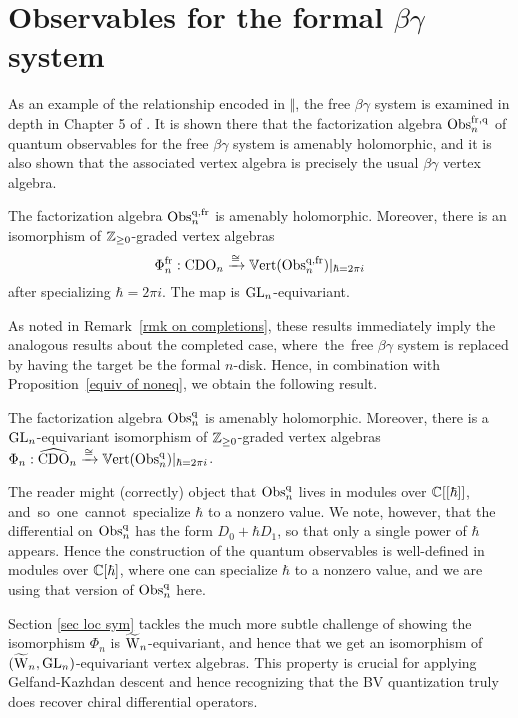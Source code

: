 \section{Observables for the formal $\beta\gamma$ system}

As an example of the relationship encoded in $\Vert$,
the free $\beta\gamma$ system is examined in depth in Chapter 5 of \cite{CG1}.
It is shown there that the factorization algebra ${\rm Obs}^{{\rm fr},{\rm q}}_n$ of quantum observables for the free $\beta\gamma$ system is amenably holomorphic,
and it is also shown that the associated vertex algebra is precisely the usual $\beta\gamma$ vertex algebra.

\begin{thm}
The factorization algebra ${\rm Obs}^{{\rm q},{\rm fr}}_n$ is amenably holomorphic. 
Moreover, 
there is an isomorphism of $\mathbb Z_{\geq 0}$-graded vertex algebras 
\[
\Phi^{{\rm fr}}_n : {\rm CDO}_n \xrightarrow{\cong} \mathbb{V}{\rm ert}({\rm Obs}^{{\rm q},{\rm fr}}_n)|_{\hbar= 2 \pi i}
\] 
after specializing $\hbar=2 \pi i$.
The map is ${\rm GL}_n$-equivariant.
\end{thm}

As noted in Remark~\ref{rmk on completions}, 
these results immediately imply the analogous results about the completed case, \si 
where the free $\beta\gamma$ system is replaced by having the target be the formal $n$-disk.
Hence, in combination with Proposition~\ref{equiv of noneq},
we obtain the following result.

\begin{cor}
The factorization algebra ${\rm Obs}^{\rm q}_n$ is amenably holomorphic. 
Moreover, there is a ${\rm GL}_n$-equivariant isomorphism of $\mathbb Z_{\geq 0}$-graded vertex algebras 
$\Phi_n : \widehat{\rm CDO}_n \xrightarrow{\cong} \mathbb{V}{\rm ert}({\rm Obs}^{\rm q}_n)|_{\hbar= 2 \pi i}$.
\end{cor}

\begin{rmk}
The reader might (correctly) object that ${\rm Obs}^{\rm q}_n$ lives in modules over $\mathbb C[[\hbar]]$, \si 
and so one cannot specialize $\hbar$ to a nonzero value.
We note, however, that the differential on ${\rm Obs}^{\rm q}_n$ has the form $D_0 + \hbar D_1$, 
so that only a single power of $\hbar$ appears.
Hence the construction of the quantum observables is well-defined in modules over $\mathbb C[\hbar]$,
where one can specialize $\hbar$ to a nonzero value,
and we are using that version of ${\rm Obs}^{\rm q}_n$ here.
\end{rmk}

Section \ref{sec loc sym} tackles the much more subtle challenge of showing the isomorphism $\Phi_n$ is $\widetilde{{{\rm W}}}_n$-equivariant,
and hence that we get an isomorphism of $(\widetilde{{{\rm W}}}_n,{\rm GL}_n)$-equivariant vertex algebras.
This property is crucial for applying Gelfand-Kazhdan descent 
and hence recognizing that the BV quantization truly does recover chiral differential operators.


